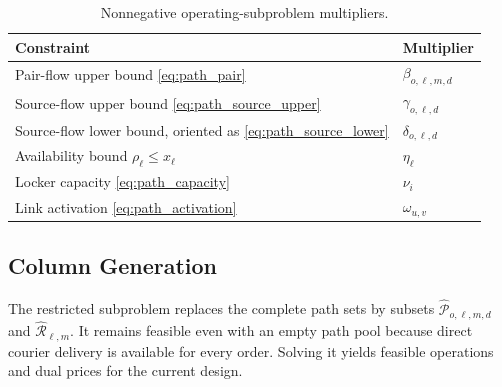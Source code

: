 \documentclass[final,3p,authoryear]{elsarticle}
\begin{document}
\begin{table}[htbp]
\centering
\caption{Nonnegative operating-subproblem multipliers.}
\label{tab:path_duals}
\begin{tabular}{ll}
\toprule
Constraint & Multiplier\\
\midrule
Pair-flow upper bound \eqref{eq:path_pair} & $\beta_{o,\ell,m,d}$\\
Source-flow upper bound \eqref{eq:path_source_upper} & $\gamma_{o,\ell,d}$\\
Source-flow lower bound, oriented as \eqref{eq:path_source_lower} & $\delta_{o,\ell,d}$\\
Availability bound $\rho_\ell\le x_\ell$ & $\eta_\ell$\\
Locker capacity \eqref{eq:path_capacity} & $\nu_i$\\
Link activation \eqref{eq:path_activation} & $\omega_{u,v}$\\
\bottomrule
\end{tabular}
\end{table}

\subsection{Column Generation}
\label{subsec:path_cg}

The restricted subproblem replaces the complete path sets by subsets $\widehat{\mathcal P}_{o,\ell,m,d}$ and $\widehat{\mathcal R}_{\ell,m}$.
It remains feasible even with an empty path pool because direct courier delivery is available for every order.
Solving it yields feasible operations and dual prices for the current design.
\end{document}
